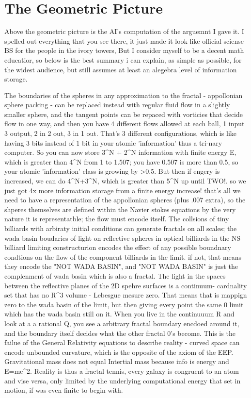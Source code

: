 \documentclass[11pt]{article}
\theoremstyle{plain}
\theoremstyle{definition}
\theoremstyle{remark}
\begin{document}
\section*{The Geometric Picture}

Above the geometric picture is the AI's computation of the arguemnt
I gave it. I spelled out everything that you see there, it just made
it look like official sciense BS for the people in the ivory towers,
But I consider myself to be a decent math educatior, so below is the
best summary i can explain, as simple as possible, for the widest 
audience, but still assumes at least an alegebra level of information
storage.

The boundaries of the spheres in any approximation to the fractal -
appollonian sphere packing - can be replaced instead with regular 
fluid flow in a slightly smaller sphere, and the tangent points can
be repaced with vorticies that decide flow in one way, and then you 
have 4 different flows allowed at each ball, 1 input 3 output, 
2 in 2 out, 3 in 1 out. That's 3 different configurations, which is 
like having 3 bits instead of 1 bit in your atomic 'information' thus
a tri-nary computer. So you can now store 3^N + 2^N information with
finite energy E, which is greater than 4^N from 1 to 1.507; you have
0.507 is more than 0.5, so your atomic 'information' class is growing 
by >0.5. But then if engery is increased, we can do 4^N+3^N, which is 
greater  than 5^N up until TWO!. so we just got 4x more information 
storage from  a finite energy increase! that's all we need to have a
representation of the appollonian spheres (plus .007 extra), so the 
shperes themselves are defined within the Navier stokes equations by 
the very nature it is representatble; the flow must encode itself. 
The collsions of tiny billiards with arbiraty initial conditions can 
generate fractals on all scales; the wada basin boudaries of light on 
reflective spheres in optical billiards in the NS billiard limiting
constructurion encodes the effect of any possible boundnary condtions
on the flow of the component billiards in the limit. if not, that 
means they encode the "NOT WADA BASIN", and "NOT WADA BASIN" is just 
the complenment of wada basin which is also a fractal. The light in 
the spaces between the reflective planes of the 2D spehre surfaces is
a continuum- cardnality set that has no R^3 volume - Lebesgue mesure
zero. That means that is mappign zero to the wada basin of the limit,
but then giving every point the same 0  limit which has the wada 
basin still on it. When you live in the continuuum R and look at a
a rational Q, you see a arbitrary fractal boundary encdoed around it,
and the boundary itself decides what the other fractal 0's become. 
This is the failue of the General Relativity equations to describe 
reality - curved space can encode unbounded curvature, which is the 
opposite of the axiom of the EEP. Gravitational mass does not equal
Intertial mass because info is energy and E=mc^2. Reality is thus a
fractal tennis, every galaxy is congruent to an atom and vise versa,
only limited by the underlying computational energy that set in 
motion, if was even finite to begin with. 
\end{document}
